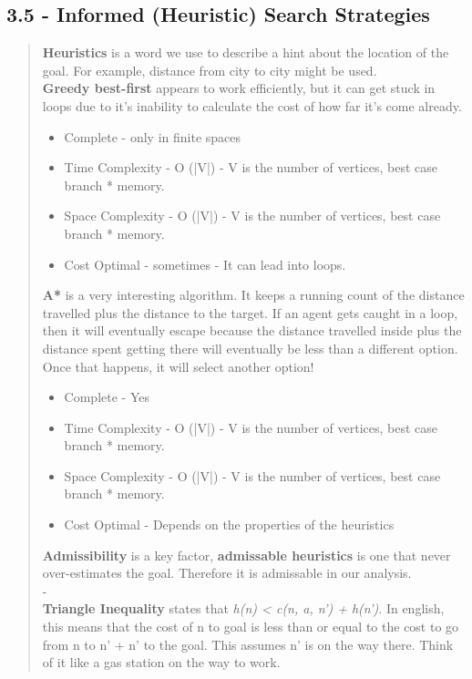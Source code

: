 \documentclass{article}
\begin{document}
\subsection{3.5 - Informed (Heuristic) Search Strategies}
\begin{quote}
    \textbf{Heuristics} is a word we use to describe a hint about the location of the goal. For example, distance from city to city might be used.
    \\ \textbf{Greedy best-first} appears to work efficiently, but
    it can get stuck in loops due to it's inability to calculate the cost of how far it's come already.
    \begin{itemize}
        \item Complete - only in finite spaces
        \item Time Complexity - O (|V|) - V is the number of vertices, best case branch * memory.
        \item Space Complexity - O (|V|) - V is the number of vertices, best case branch * memory.
        \item Cost Optimal - sometimes - It can lead into loops.
    \end{itemize}
    \textbf{A*} is a very interesting algorithm. It keeps a running count of the distance travelled plus the distance to the target. If an agent gets caught in a loop, then it will eventually
    escape because the distance travelled inside plus the distance spent getting there will eventually be less than a different option. Once that happens, it will select another option!
    \begin{itemize}
        \item Complete - Yes
        \item Time Complexity - O (|V|) - V is the number of vertices, best case branch * memory.
        \item Space Complexity - O (|V|) - V is the number of vertices, best case branch * memory.
        \item Cost Optimal - Depends on the properties of the heuristics
    \end{itemize}
    \textbf{Admissibility} is a key factor, \textbf{admissable heuristics} is one that never over-estimates the goal. Therefore it is admissable in our analysis.
    \\ - \\ \textbf{Triangle Inequality} states that \textit{h(n) < c(n, a, n') + h(n')}. In english, this means that the cost of n to goal is
    less than or equal to the cost to go from n to n' + n' to the goal. This assumes n' is on the way there. Think of it like a gas station on the way to work.

\end{quote}
\end{document}
